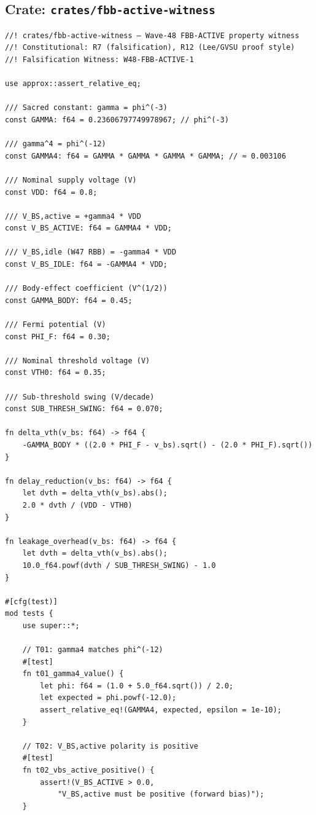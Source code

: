 \documentclass[12pt,a4paper]{report}
\theoremstyle{plain}
\theoremstyle{definition}
\theoremstyle{remark}
\begin{document}
\subsection{Crate: \texttt{crates/fbb-active-witness}}

\begin{lstlisting}[style=rust,
  caption={Rust witness skeleton — \texttt{crates/fbb-active-witness/src/lib.rs} (14+ tests).}]
//! crates/fbb-active-witness — Wave-48 FBB-ACTIVE property witness
//! Constitutional: R7 (falsification), R12 (Lee/GVSU proof style)
//! Falsification Witness: W48-FBB-ACTIVE-1

use approx::assert_relative_eq;

/// Sacred constant: gamma = phi^(-3)
const GAMMA: f64 = 0.23606797749978967; // phi^(-3)

/// gamma^4 = phi^(-12)
const GAMMA4: f64 = GAMMA * GAMMA * GAMMA * GAMMA; // ≈ 0.003106

/// Nominal supply voltage (V)
const VDD: f64 = 0.8;

/// V_BS,active = +gamma4 * VDD
const V_BS_ACTIVE: f64 = GAMMA4 * VDD;

/// V_BS,idle (W47 RBB) = -gamma4 * VDD
const V_BS_IDLE: f64 = -GAMMA4 * VDD;

/// Body-effect coefficient (V^(1/2))
const GAMMA_BODY: f64 = 0.45;

/// Fermi potential (V)
const PHI_F: f64 = 0.30;

/// Nominal threshold voltage (V)
const VTH0: f64 = 0.35;

/// Sub-threshold swing (V/decade)
const SUB_THRESH_SWING: f64 = 0.070;

fn delta_vth(v_bs: f64) -> f64 {
    -GAMMA_BODY * ((2.0 * PHI_F - v_bs).sqrt() - (2.0 * PHI_F).sqrt())
}

fn delay_reduction(v_bs: f64) -> f64 {
    let dvth = delta_vth(v_bs).abs();
    2.0 * dvth / (VDD - VTH0)
}

fn leakage_overhead(v_bs: f64) -> f64 {
    let dvth = delta_vth(v_bs).abs();
    10.0_f64.powf(dvth / SUB_THRESH_SWING) - 1.0
}

#[cfg(test)]
mod tests {
    use super::*;

    // T01: gamma4 matches phi^(-12)
    #[test]
    fn t01_gamma4_value() {
        let phi: f64 = (1.0 + 5.0_f64.sqrt()) / 2.0;
        let expected = phi.powf(-12.0);
        assert_relative_eq!(GAMMA4, expected, epsilon = 1e-10);
    }

    // T02: V_BS,active polarity is positive
    #[test]
    fn t02_vbs_active_positive() {
        assert!(V_BS_ACTIVE > 0.0,
            "V_BS,active must be positive (forward bias)");
    }


\end{lstlisting}
\end{document}
